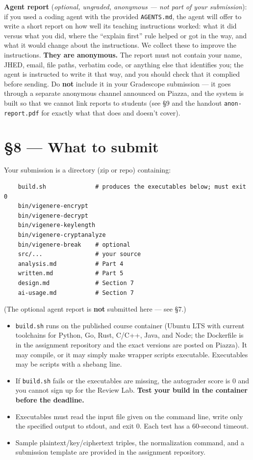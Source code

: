 \documentclass[11pt]{article}
\newcommand{\file}[1]{\texttt{#1}}
\begin{document}
\medskip\noindent\textbf{Agent report} (\emph{optional, ungraded, anonymous --- not part of your submission}): if you used a coding agent with the provided \file{AGENTS.md}, the agent will offer to write a short report on how well its teaching instructions worked: what it did versus what you did, where the ``explain first'' rule helped or got in the way, and what it would change about the instructions. We collect these to improve the instructions. \textbf{They are anonymous.} The report must not contain your name, JHED, email, file paths, verbatim code, or anything else that identifies you; the agent is instructed to write it that way, and you should check that it complied before sending. Do \textbf{not} include it in your Gradescope submission --- it goes through a separate anonymous channel announced on Piazza, and the system is built so that we cannot link reports to students (see \S9 and the handout \file{anon-report.pdf} for exactly what that does and doesn't cover).

\section*{\S8 --- What to submit}

Your submission is a directory (zip or repo) containing:
\begin{verbatim}
    build.sh              # produces the executables below; must exit 0
    bin/vigenere-encrypt
    bin/vigenere-decrypt
    bin/vigenere-keylength
    bin/vigenere-cryptanalyze
    bin/vigenere-break    # optional
    src/...               # your source
    analysis.md           # Part 4
    written.md            # Part 5
    design.md             # Section 7
    ai-usage.md           # Section 7
\end{verbatim}
(The optional agent report is \textbf{not} submitted here --- see \S7.)

\medskip \noindent
\begin{itemize}
\item \file{build.sh} runs on the published course container (Ubuntu LTS with current toolchains for Python, Go, Rust, C/C++, Java, and Node; the Dockerfile is in the assignment repository and the exact versions are posted on Piazza). It may compile, or it may simply make wrapper scripts executable. Executables may be scripts with a shebang line.
\item If \file{build.sh} fails or the executables are missing, the autograder score is 0 and you cannot sign up for the Review Lab. \textbf{Test your build in the container before the deadline.}
\item Executables must read the input file given on the command line, write only the specified output to stdout, and exit 0. Each test has a 60-second timeout.
\item Sample plaintext/key/ciphertext triples, the normalization command, and a submission template are provided in the assignment repository.
\end{itemize}
\end{document}
